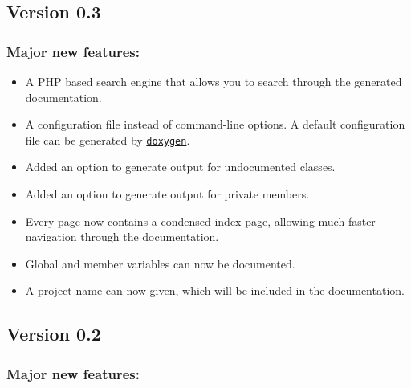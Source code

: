\subsection*{Version 0.3}

\subsubsection*{Major new features:}

\begin{itemize}
\item A PHP based search engine that allows you to search through the generated documentation. \item A configuration file instead of command-line options. A default configuration file can be generated by \href{doxygen_usage.html}{\tt doxygen}. \item Added an option to generate output for undocumented classes. \item Added an option to generate output for private members. \item Every page now contains a condensed index page, allowing much faster navigation through the documentation. \item Global and member variables can now be documented. \item A project name can now given, which will be included in the documentation. \end{itemize}


\subsection*{Version 0.2}

\subsubsection*{Major new features:}

